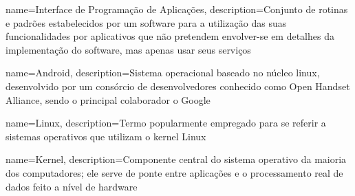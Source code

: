 
{
	name={Interface de Programação de Aplicações},
    description={Conjunto de rotinas e padrões estabelecidos por um software para a
    utilização das suas funcionalidades por aplicativos que não pretendem envolver-se
    em detalhes da implementação do software, mas apenas usar seus serviços}
}

{
	name=Android,
    description={Sistema operacional baseado no núcleo \gls{linux}, desenvolvido por
    um consórcio de desenvolvedores conhecido como Open Handset Alliance, sendo o
    principal colaborador o Google}
}

{
	name=Linux,
    description={Termo popularmente empregado para se referir a sistemas operativos
    que utilizam o \gls{kernel} Linux}
}

{
	name=Kernel,
    description={Componente central do sistema operativo da maioria dos computadores;
    ele serve de ponte entre aplicações e o processamento real de dados feito a nível
    de hardware}
}